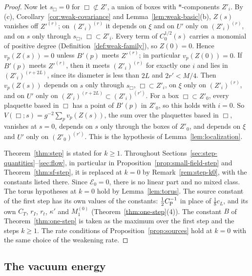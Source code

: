\begin{proof}
Now let $s_\Box=0$ for $\Box\not\subset Z'$, a union of boxes with $*$-components $Z'_i$. By (c), Corollary~\ref{cor:weak-covariance} and Lemma~\ref{lem:weak-basic}(b), $Z(s)$ vanishes off $Z'^{(r)}$; on $(Z'_i)^{(r)}$ it depends on $\xi$ and on $U'$ only on $(Z'_i)^{(r)}$, and on $s$ only through $s_\Box$, $\Box\subset Z'_i$. Every term of $C_0^{1/2}(s)$ carries a monomial of positive degree (Definition~\ref{def:weak-family}), so $Z(0)=0$. Hence $v_p(Z(s))=0$ unless $B'(p)$ meets $Z'^{(r)}$; in particular $v_p(Z(0))=0$. If $B'(p)$ meets $Z'^{(r)}$, then it meets $(Z'_i)^{(r)}$ for exactly one $i$ and lies in $(Z'_i)^{(r+2L)}$, since its diameter is less than $2L$ and $2r'<M/4$. Then $v_p(Z(s))$ depends on $s$ only through $s_\Box$, $\Box\subset Z'_i$, on $\xi$ only on $(Z'_i)^{(r)}$, and on $U'$ only on $(Z'_i)^{(r+2L)}\subset(Z'_i)^{(r')}$. For a box $\Box\subset Z'_0$, every plaquette based in $\Box$ has a point of $B'(p)$ in $Z'_0$, so this holds with $i=0$. So $V(\Box;s)=g^{-2}\sum_pv_p(Z(s))$, the sum over the plaquettes based in $\Box$, vanishes at $s=0$, depends on $s$ only through the boxes of $Z'_0$, and depends on $\xi$ and $U'$ only on $(Z'_0)^{(r')}$. This is the hypothesis of Lemma~\ref{lem:localization}.

Theorem~\ref{thm:step} is stated for $k\ge1$. Throughout Sections~\ref{sec:step-quantities}--\ref{sec:flow}, in particular in Proposition~\ref{prop:small-field-step} and Theorem~\ref{thm:sf-step}, it is replaced at $k=0$ by Remark~\ref{rem:step-k0}, with the constants listed there. Since $\mathcal E_0=0$, there is no linear part and no mixed class. The torus hypotheses at $k=0$ hold by Lemma~\ref{lem:torus}. The source constant of the first step has its own values of the constants: $\frac12C_{\rm P}^{-1}$ in place of $\frac18c_L$, and its own $C_T$, $r_I$, $r_t$, $\kappa'$ and $M_1^{(0)}$ (Theorem~\ref{thm:one-step}(4)). The constant $B$ of Theorem~\ref{thm:one-step} is taken as the maximum over the first step and the steps $k\ge1$. The rate conditions of Proposition~\ref{prop:sources} hold at $k=0$ with the same choice of the weakening rate.
\end{proof}

\subsection{The vacuum energy}\label{subsec:tf-vacuum}

